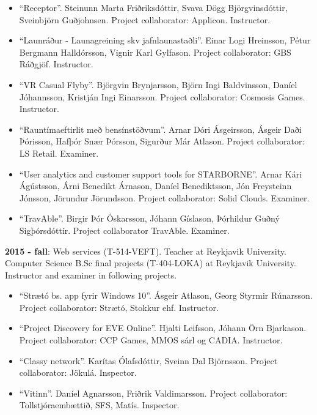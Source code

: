 \begin{itemize}
\item ``Receptor''. Steinunn Marta Friðriksdóttir, Svava Dögg Björgvinsdóttir, Sveinbjörn Guðjohnsen. Project collaborator: Applicon. Instructor.

\item ``Launráður - Launagreining skv jafnlaunastaðli''. Einar Logi Hreinsson, Pétur Bergmann Halldórsson, Vignir Karl Gylfason. Project collaborator: GBS Ráðgjöf. Instructor.

\item ``VR Casual Flyby''. Björgvin Brynjarsson, Björn Ingi Baldvinsson, Daníel Jóhannsson, Kristján Ingi Einarsson. Project collaborator: Cosmosis Games. Instructor.

\item ``Rauntímaeftirlit með bensínstöðvum''. Arnar Dóri Ásgeirsson, Ásgeir Daði Þórisson, Hafþór Snær Þórsson, Sigurður Már Atlason. Project collaborator: LS Retail. Examiner.

\item ``User analytics and customer support tools for STARBORNE''. Arnar Kári Ágústsson, Árni Benedikt Árnason, Daníel Benediktsson, Jón Freysteinn Jónsson,
Jörundur Jörundsson. Project collaborator: Solid Clouds. Examiner.

\item ``TravAble''. Birgir Þór Óskarsson, Jóhann Gíslason, Þórhildur Guðný Sigþórsdóttir. Project collaborator TravAble. Examiner.
\end{itemize}


\textbf{2015 - fall}: Web services (T-514-VEFT). Teacher at Reykjavik University. Computer Science B.Sc final projects (T-404-LOKA) at Reykjavik University. Instructor and examiner in following projects.

\begin{itemize}
\item ``Strætó bs. app fyrir Windows 10''. Ásgeir Atlason, Georg Styrmir Rúnarsson. Project collaborator: Strætó, Stokkur ehf. Instructor.

\item ``Project Discovery for EVE Online''. Hjalti Leifsson, Jóhann Örn Bjarkason. Project collaborator: CCP Games, MMOS sárl og CADIA. Instructor.

\item ``Classy network''. Karítas Ólafsdóttir, Sveinn Dal Björnsson. Project collaborator: Jökulá. Inspector.

\item ``Vitinn''. Daníel Agnarsson, Friðrik Valdimarsson. Project collaborator: Tollstjóraembættið, SFS, Matís. Inspector.
\end{itemize}



